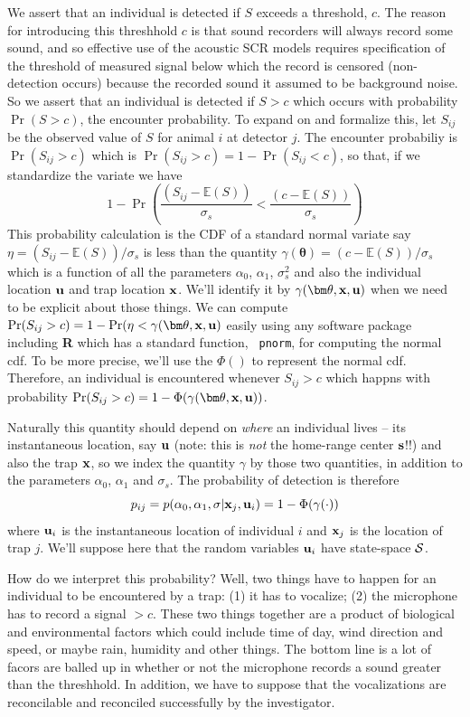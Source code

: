 We assert that an individual is detected if $S$ exceeds a threshold,
$c$. The reason for introducing this threshhold $c$ is that sound
recorders will always record some sound, and so effective use of the
acoustic SCR models requires specification of the threshold of
measured signal below which the record is censored (non-detection
occurs) because the recorded sound it assumed to be background noise.
So we assert that an individual is detected if $S>c$ which occurs with
probability $\Pr(S > c)$, the encounter probability.  To expand on and
formalize this, let $S_{ij}$ be the observed value of $S$ for animal $i$ at
detector $j$.  The encounter probabiliy is $\Pr(S_{ij}>c)$ which is
$\Pr(S_{ij}>c) = 1- \Pr(S_{ij} < c)$, so that, if we standardize the
variate we have
\[
1-\Pr\left( \frac{ (S_{ij}- \mathbb{E}(S))}{\sigma_{s}}  <  \frac{ 
(c -  \mathbb{E}(S)) }{\sigma_{s}} \right)
\]
This probability 
calculation is the CDF  of a standard normal variate 
say $\eta = (S_{ij}- \mathbb{E}(S))/\sigma_{s}$ is
less than the quantity
$\gamma({\bm \theta}) = (c -  \mathbb{E}(S))/\sigma_{s}$
which is a function of all the parameters $\alpha_{0}$, $\alpha_{1}$,
$\sigma_{s}^{2}$ and also the individual location ${\bf u}$ and trap location
${\bf x}$. We'll identify it by 
$\gamma({\bm \theta},{\bf x},{\bf u})$ when we need to be explicit
about those things.
 We can compute
$\Pr(S_{ij}>c) = 1-\Pr(  \eta <
\gamma({\bm \theta}, {\bf x},{\bf u})$ easily using any software
package including {\bf R} which has a standard function, \mbox{\tt
  pnorm}, for computing the normal cdf.
To be more precise, we'll use the $\Phi()$ to represent the normal
cdf. Therefore, an individual is encountered whenever $S_{ij}>c$ which
happns with probability
$\Pr(S_{ij}>c) = 1-\Phi( \gamma({\bm \theta}, {\bf x},{\bf u}) )$.

Naturally this quantity should depend on {\it where} an individual lives
-- its instantaneous location, say ${\bf u}$ (note: this is {\it not}
the home-range center ${\bf s}$!!) and also the trap ${\bf x}$, so we
 index the quantity $\gamma$ by those two quantities, in
addition to the parameters $\alpha_{0}$, $\alpha_{1}$ and $\sigma_{s}$. 
The probability of detection is therefore
\[
p_{ij} = p(\alpha_0, \alpha_1, \sigma | {\bf x}_{j}, {\bf u}_{i} ) = 1- \Phi( \gamma(\cdot))
\]
where
 ${\bf u}_{i}$ is the instantaneous location of individual $i$ and 
${\bf x}_{j}$ is the location of trap $j$.  We'll suppose here that
the random variables ${\bf u}_{i}$ have state-space ${\cal S}$.

How do we interpret this probability? Well, two things have to happen
for an individual to be encountered by a trap:
(1)  it has to  vocalize; (2) 
the microphone has to record a signal $>c$. These two things
together are a product of biological and environmental factors which
could include time of day, wind direction and speed, or maybe rain,
humidity and other things. The bottom line is a lot of facors are
balled up in whether or not the microphone records a sound greater
than the threshhold.  In addition,
we have to suppose that the vocalizations 
are reconcilable and reconciled successfully by the 
investigator.

